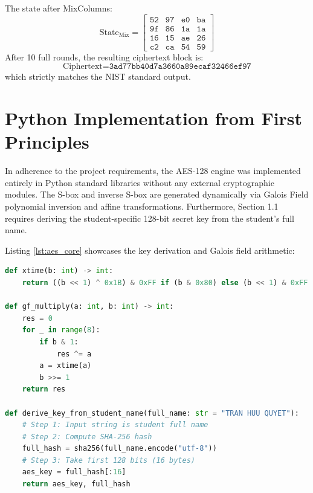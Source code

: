 The state after MixColumns:
\begin{equation}
\text{State}_{\text{Mix}} = \begin{bmatrix}
\texttt{52} & \texttt{97} & \texttt{e0} & \texttt{ba} \\
\texttt{9f} & \texttt{86} & \texttt{1a} & \texttt{1a} \\
\texttt{16} & \texttt{15} & \texttt{ae} & \texttt{26} \\
\texttt{c2} & \texttt{ca} & \texttt{54} & \texttt{59}
\end{bmatrix}
\end{equation}
After 10 full rounds, the resulting ciphertext block is:
\begin{equation}
\text{Ciphertext} = \texttt{3ad77bb40d7a3660a89ecaf32466ef97}
\end{equation}
which strictly matches the NIST standard output.

\clearpage
\section{Python Implementation from First Principles}
In adherence to the project requirements, the AES-128 engine was implemented entirely in Python standard libraries without any external cryptographic modules. The S-box and inverse S-box are generated dynamically via Galois Field polynomial inversion and affine transformations. Furthermore, Section 1.1 requires deriving the student-specific 128-bit secret key from the student's full name.

Listing \ref{lst:aes_core} showcases the key derivation and Galois field arithmetic:
\begin{lstlisting}[language=Python, caption={Galois Field arithmetic and student key derivation in AES-128.}, label={lst:aes_core}]
def xtime(b: int) -> int:
    return ((b << 1) ^ 0x1B) & 0xFF if (b & 0x80) else (b << 1) & 0xFF

def gf_multiply(a: int, b: int) -> int:
    res = 0
    for _ in range(8):
        if b & 1:
            res ^= a
        a = xtime(a)
        b >>= 1
    return res

def derive_key_from_student_name(full_name: str = "TRAN HUU QUYET"):
    # Step 1: Input string is student full name
    # Step 2: Compute SHA-256 hash
    full_hash = sha256(full_name.encode("utf-8"))
    # Step 3: Take first 128 bits (16 bytes)
    aes_key = full_hash[:16]
    return aes_key, full_hash
\end{lstlisting}

